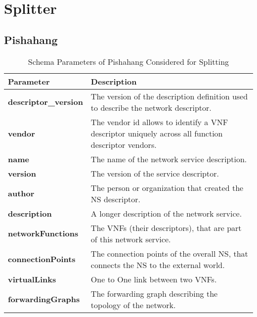 \newpage
\section{Splitter}
\subsection{Pishahang}
\begin{table}[H] \cite{SONATASchemaDocumentation}
	\begin{center}
		\caption{Schema Parameters of Pishahang Considered for Splitting}
		\label{tab:table1}
		\begin{tabular}{l|l} 
			\textbf{Parameter} & \textbf{Description} \\
			\hline
			\textbf{descriptor\_version} & The version of the description definition used to describe the network descriptor. \\ 
			\textbf{vendor } & The vendor id allows to identify a VNF descriptor uniquely across all function descriptor vendors.  \\
			\textbf{name} & The name of the network service description. \\
			\textbf{version} & The version of the service descriptor. \\
			\textbf{author} & The person or organization that created the NS descriptor. \\
			\textbf{description} & A longer description of the network service. \\
			\textbf{networkFunctions} & The VNFs (their descriptors), that are part of this network service. \\
			\textbf{connectionPoints} & The connection points of the overall NS, that connects the NS to the external world. \\
			\textbf{virtualLinks} & One to One link between two VNFs. \\
			\textbf{forwardingGraphs} & The forwarding graph describing the topology of the network. \\
		\end{tabular}
	\end{center}
\end{table}
